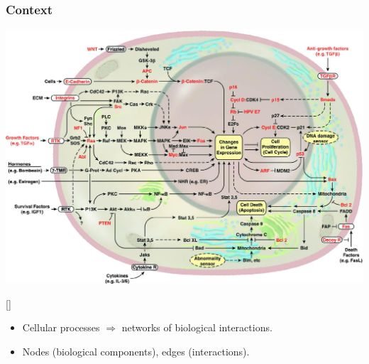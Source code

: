 \begin{frame}[c]
  \frametitle{Context}
\begin{center}
  \includegraphics[scale=0.12]{images/cellule-description.jpeg}
\end{center}
\begin{center}
{\tiny \color{darkgreen}[\citelui]}
\end{center}


\begin{itemize}
\item Cellular processes $\Longrightarrow$ networks of biological interactions.
\item Nodes (biological components), edges (interactions).
\end{itemize}







\end{frame}

